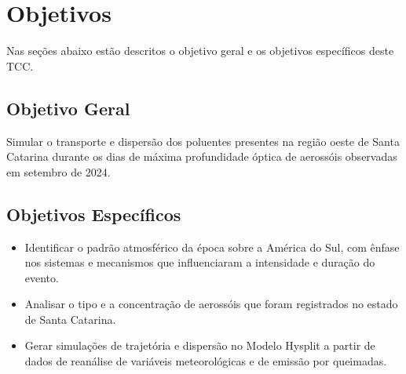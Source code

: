 \section{Objetivos}

Nas seções abaixo estão descritos o objetivo geral e os objetivos específicos deste TCC.

\subsection{Objetivo Geral}

	Simular o transporte e dispersão dos poluentes presentes na região oeste de Santa Catarina durante os dias de máxima profundidade óptica de aerossóis observadas em setembro de 2024.

\subsection{Objetivos Específicos}

	\begin{itemize}
		\item Identificar o padrão atmosférico da época sobre a América do Sul, com ênfase nos sistemas e mecanismos que influenciaram a intensidade e duração do evento.
		\item Analisar o tipo e a concentração de aerossóis que foram registrados no estado de Santa Catarina.
		\item Gerar simulações de trajetória e dispersão no Modelo Hysplit a partir de dados de reanálise de variáveis meteorológicas e de emissão por queimadas.
	\end{itemize}
	
	
	